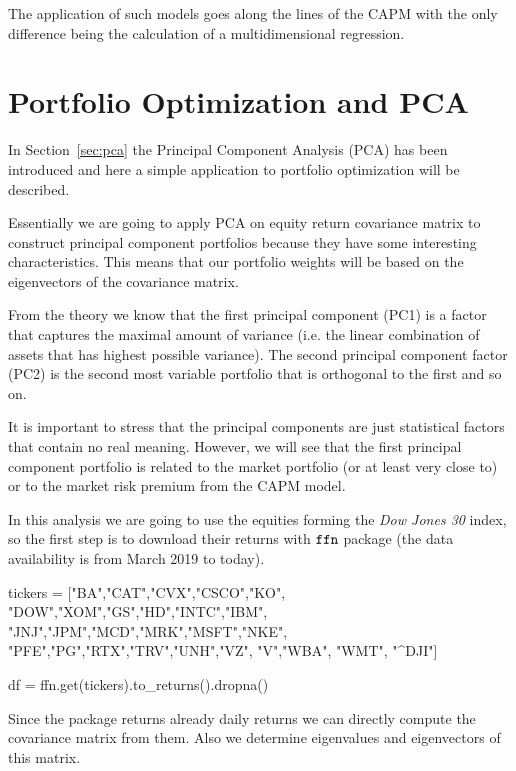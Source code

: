 The application of such models goes along the lines of the CAPM with the only difference being the calculation of a multidimensional regression.

\section{Portfolio Optimization and PCA}
\label{portfolio-optimization-and-pca}

In Section~\ref{sec:pca} the Principal Component Analysis (PCA) has been introduced and here a simple application to portfolio optimization will be described.

Essentially we are going to apply PCA on equity return covariance matrix to construct principal component portfolios because they have some interesting characteristics. This means that our portfolio weights will be based on the eigenvectors of the covariance matrix.

From the theory we know that the first principal component (PC1) is a factor that captures the maximal amount of variance (i.e. the linear combination of assets that has highest possible variance). The second principal component factor (PC2) is the second most variable portfolio that is orthogonal to the first and so on.

It is important to stress that the principal components are just statistical factors that contain no real meaning. However, we will see that the first principal component portfolio is related to the market portfolio (or at least very close to) or to the market risk premium from the CAPM model.

In this analysis we are going to use the equities forming the \emph{Dow Jones 30} index, so the first step is to download their returns with \(\tt{ffn}\) package (the data availability is from March 2019 to today).
	
\begin{ipython}
tickers = ["BA","CAT","CVX","CSCO","KO",
           "DOW","XOM","GS","HD","INTC","IBM",
           "JNJ","JPM","MCD","MRK","MSFT","NKE",
           "PFE","PG","RTX","TRV","UNH","VZ",
           "V","WBA", "WMT", "^DJI"]
           
df = ffn.get(tickers).to_returns().dropna()
\end{ipython}
	
Since the package returns already daily returns we can directly compute the covariance matrix from them. Also we determine eigenvalues and eigenvectors of this matrix.

